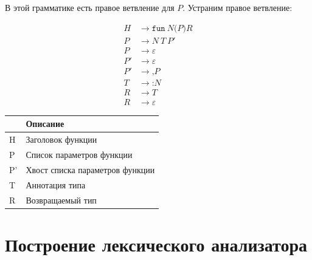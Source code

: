 В этой грамматике есть правое ветвление для \(P\). Устраним правое ветвление:

\begin{minipage}{.2\textwidth}
    \begin{align*}
        H  & \to \texttt{fun}\ N\texttt{(}P\texttt{)}R \\
        P  & \to N\ T\ P'                              \\
        P  & \to \varepsilon                           \\
        P' & \to \varepsilon                           \\
        P' & \to \texttt{,} P                          \\
        T  & \to {}\texttt{:} N                        \\
        R  & \to T                                     \\
        R  & \to \varepsilon
    \end{align*}
\end{minipage}
\begin{minipage}{.8\textwidth}
    \begin{center}
        \begin{tabular}{Ll}
            \toprule
             & Описание                        \\ \midrule
            H                 & Заголовок функции               \\
            P                 & Список параметров функции       \\
            P'                & Хвост списка параметров функции \\
            T                 & Аннотация типа                  \\
            R                 & Возвращаемый тип                \\
            \bottomrule
        \end{tabular}
    \end{center}
\end{minipage}

\section{Построение лексического анализатора}

